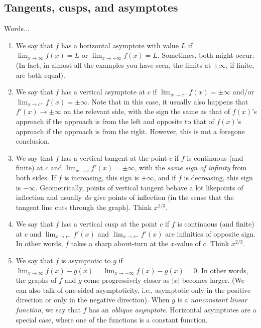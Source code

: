 \documentclass[10pt]{amsart}
\begin{document}
\subsection{Tangents, cusps, and asymptotes}

Words...

\begin{enumerate}

\item We say that $f$ has a horizontal asymptote with value $L$ if
  $\lim_{x \to \infty} f(x) = L$ or $\lim_{x \to -\infty} f(x) =
  L$. Sometimes, both might occur. (In fact, in almost all the
  examples you have seen, the limits at $\pm \infty$, if finite, are
  both equal).
\item We say that $f$ has a vertical asymptote at $c$ if $\lim_{x \to
  c^-} f(x) = \pm \infty$ and/or $\lim_{x \to c^+} f(x) = \pm
  \infty$. Note that in this case, it usually also happens that $f'(x)
  \to \pm \infty$ on the relevant side, with the sign the same as that
  of $f(x)$'s approach if the approach is from the left and opposite
  to that of $f(x)$'s approach if the approach is from the
  right. However, this is not a foregone conclusion.
\item We say that $f$ has a vertical tangent at the point $c$ if $f$
  is continuous (and finite) at $c$ and $\lim_{x \to c} f'(x) = \pm
  \infty$, with the {\em same sign of infinity} from both sides. If
  $f$ is increasing, this sign is $+\infty$, and if $f$ is decreasing,
  this sign is $-\infty$. Geometrically, points of vertical tangent
  behave a lot likepoints of inflection and usually {\em do} give
  points of inflection (in the sense that the tangent line cuts
  through the graph). Think $x^{1/3}$.
\item We say that $f$ has a vertical cusp at the point $c$ if $f$ is
  continuous (and finite) at $c$ and $\lim_{x \to c^-} f'(x)$ and
  $\lim_{x \to c^+} f'(x)$ are infinities of opposite sign. In other
  words, $f$ takes a sharp about-turn at the $x$-value of $c$. Think
  $x^{2/3}$.
\item We say that $f$ is asymptotic to $g$ if $\lim_{x \to \infty}
  f(x) - g(x) = \lim_{x \to -\infty} f(x) - g(x) = 0$. In other words,
  the graphs of $f$ and $g$ come progressively closer as $|x|$ becomes
  larger. (We can also talk of one-sided asymptoticity, i.e.,
  asymptotic only in the positive direction or only in the negative
  direction). When $g$ is a {\em nonconstant linear function}, we say
  that $f$ has an {\em oblique asymptote}. Horizontal asymptotes are a
  special case, where one of the functions is a constant function.
\end{enumerate}
\end{document}
